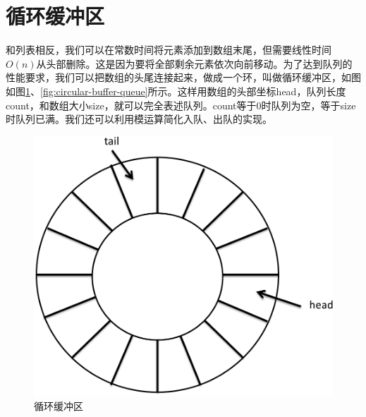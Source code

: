 \documentclass[b5paper]{ctexart}
\begin{document}
\section{循环缓冲区}

和列表相反，我们可以在常数时间将元素添加到数组末尾，但需要线性时间$O(n)$从头部删除。这是因为要将全部剩余元素依次向前移动。为了达到队列的性能要求，我们可以把数组的头尾连接起来，做成一个环，叫做循环缓冲区，如图如图\ref{fig:circular-buffer}、\ref{fig:circular-buffer-queue}所示。这样用数组的头部坐标head，队列长度count，和数组大小size，就可以完全表述队列。count等于0时队列为空，等于size时队列已满。我们还可以利用模运算简化入队、出队的实现。

\begin{figure}[htbp]
 \centering
 \includegraphics[scale=0.3]{img/ring-buffer}
 \caption{循环缓冲区}
 \label{fig:circular-buffer}
\end{figure}
\end{document}
